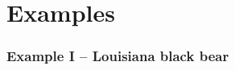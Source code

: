 \documentclass[color=usenames,dvipsnames]{beamer}
\begin{document}









\section{Examples}








\begin{frame}
  \frametitle{Example I -- Louisiana black bear}
  \begin{columns}
    \begin{column}{0.5\textwidth}
    \end{column}
    \begin{column}{0.5\textwidth}

\end{column}
\end{columns}
\end{frame}
\end{document}
